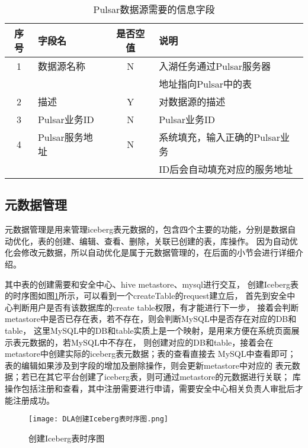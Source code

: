\begin{table}[H]
  \centering
  \caption{Pulsar数据源需要的信息字段}
  \label{tab:Pulsar数据源需要的信息字段}
  \begin{tabular}{clcl}
    \toprule
    序号  & 字段名     & 是否空值   & 说明                                      \\
    \midrule
    1    & 数据源名称  & N        & 入湖任务通过Pulsar服务器 \\
         &           &          &  地址指向Pulsar中的表 \\
    2    & 描述       & Y        & 对数据源的描述                               \\
    3    & Pulsar业务ID    & N        & Pulsar业务ID                          \\
    4    & Pulsar服务地址      & N        &  系统填充，输入正确的Pulsar业务   \\
         &                    &         &  ID后会自动填充对应的服务地址      \\
    \bottomrule
  \end{tabular}
\end{table}

\subsection{元数据管理}

元数据管理是用来管理iceberg表元数据的，包含四个主要的功能，分别是数据自动优化，表的创建、编辑、查看、删除，关联已创建的表，库操作。
因为自动优化会修改元数据，所以自动优化是属于元数据管理的，在后面的小节会进行详细介绍。

其中表的创建需要和安全中心、hive metastore、mysql进行交互，
创建Iceberg表的时序图如图\ref{fig:创建Iceberg表时序图}所示，可以看到一个createTable的request建立后，
首先到安全中心判断用户是否有该数据库的create table权限，有才能进行下一步，
接着会判断metastore中是否已存在表，若不存在，则会判断MySQL中是否存在对应的DB和table，
这里MySQL中的DB和table实质上是一个映射，是用来方便在系统页面展示表元数据的，若MySQL中不存在，
则创建对应的DB和table，接着会在metastore中创建实际的iceberg表元数据；表的查看直接去
MySQL中查看即可；表的编辑如果涉及到字段的增加及删除操作，则会更新metastore中对应的
表元数据；若已在其它平台创建了iceberg表，则可通过metastore的元数据进行关联；
库操作包括注册和查看，其中注册需要进行申请，需要安全中心相关负责人审批后才能注册成功。

\begin{figure}[H]
  \centering
  \texttt{[image: DLA创建Iceberg表时序图.png]}
  \caption{创建Iceberg表时序图}
  \label{fig:创建Iceberg表时序图}
\end{figure}


